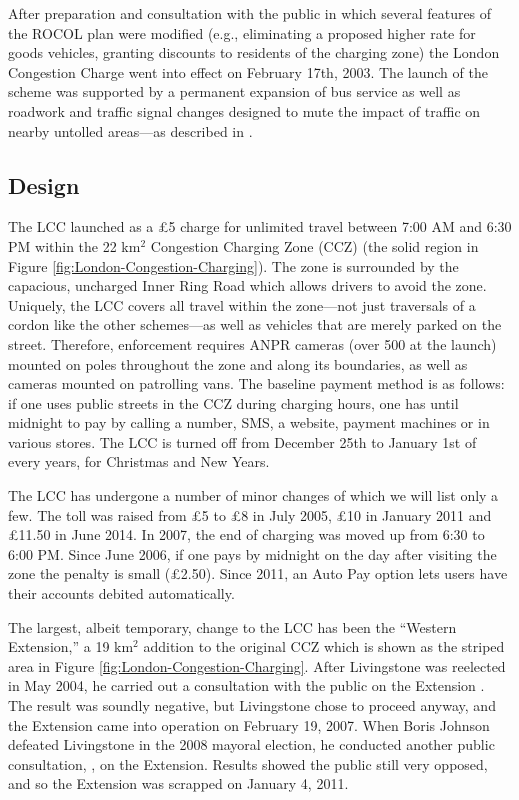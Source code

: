 After preparation and consultation with the public in which several features of the ROCOL plan were modified (e.g., eliminating a proposed higher rate for goods vehicles, granting discounts to residents of the charging zone) the London Congestion Charge went into effect on February 17th, 2003. The launch of the scheme was supported by a permanent expansion of bus service as well as roadwork and traffic signal changes designed to mute the impact of traffic on nearby untolled areas---as described in \cite[p. 132-135]{Richards2006}.

\subsection{Design}

The LCC launched as a \pounds5 charge for unlimited travel between 7:00 AM and 6:30 PM within the 22 km$^{2}$ Congestion Charging Zone (CCZ) (the solid region in Figure \ref{fig:London-Congestion-Charging}). The zone is surrounded by the capacious, uncharged Inner Ring Road which allows drivers to avoid the zone. Uniquely, the LCC covers all travel within the zone---not just traversals of a cordon like the other schemes---as well as vehicles that are merely parked on the street. Therefore, enforcement requires ANPR cameras (over 500 at the launch) mounted on poles throughout the zone and along its boundaries, as well as cameras mounted on patrolling vans. The baseline payment method is as follows: if one uses public streets in the CCZ during charging hours, one has until midnight to pay by calling a number, SMS, a website, payment machines or in various stores. The LCC is turned off from December 25th to January 1st of every years, for Christmas and New Years.


The LCC has undergone a number of minor changes of which we will list only a few. The toll was raised from \pounds5 to \pounds8 in July 2005, \pounds10 in January 2011 and \pounds11.50 in June 2014. In 2007, the end of charging was moved up from 6:30 to 6:00 PM. Since June 2006, if one pays by midnight on the day after visiting the zone the penalty is small (\pounds 2.50). Since 2011, an Auto Pay option lets users have their accounts debited automatically.

The largest, albeit temporary, change to the LCC has been the ``Western Extension,'' a 19 km$^2$ addition to the original CCZ which is shown as the striped area in Figure \ref{fig:London-Congestion-Charging}. After Livingstone was reelected in May 2004, he carried out a consultation with the public on the Extension \citep[Ch. 14]{Richards2006}. The result was soundly negative, but Livingstone chose to proceed anyway, and the Extension came into operation on February 19, 2007. When Boris Johnson defeated Livingstone in the 2008 mayoral election, he conducted another public consultation, \citet{TfL2008b}, on the  Extension. Results showed the public still very opposed, and so the Extension was scrapped on January 4, 2011.

